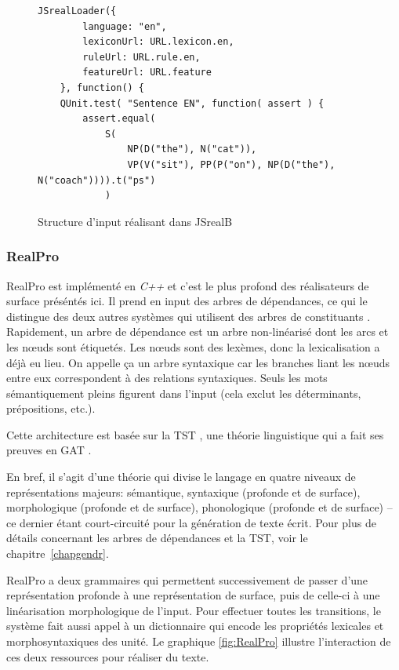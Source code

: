 \begin{figure}[htb]
\caption{Structure d'input réalisant  dans JSrealB}
\label{jsreal}
\begin{lstlisting}[language=mate]
JSrealLoader({
        language: "en",
        lexiconUrl: URL.lexicon.en,
        ruleUrl: URL.rule.en,
        featureUrl: URL.feature
    }, function() {
    QUnit.test( "Sentence EN", function( assert ) {
        assert.equal(
            S(
                NP(D("the"), N("cat")),
                VP(V("sit"), PP(P("on"), NP(D("the"), N("coach")))).t("ps")
            )
\end{lstlisting}
\end{figure}
		
\subsubsection{RealPro}
RealPro \citep{LavoieFastPortableRealizer1997} est implémenté en \emph{C++} et c'est le plus profond des réalisateurs de surface préséntés ici. Il prend en input des arbres de dépendances, ce qui le distingue des deux autres systèmes qui utilisent des arbres de constituants \citep{DBLP:conf/enlg/MolinsL15,GattSimpleNLGRealisationEngine2009}. Rapidement, un arbre de dépendance est un arbre non-linéarisé dont les arcs et les n\oe{}uds sont étiquetés. Les n\oe{}uds sont des lexèmes, donc la lexicalisation a déjà eu lieu. On appelle ça un arbre syntaxique car les branches liant les n\oe{}uds entre eux correspondent à des relations syntaxiques. Seuls les mots sémantiquement pleins figurent dans l'input (cela exclut les déterminants, prépositions, etc.).

Cette architecture est basée sur la \ac{TST} \citep{melcuk1988}, une théorie linguistique qui a fait ses preuves en \ac{GAT} \citep{iordanskaja88,LavoieFastPortableRealizer1997,WannerMARQUISGENERATIONUSERTAILORED2010,MilledemoFORGePompeu2017,Vicentegeneracionlenguajenatural2015}.

En bref, il s'agit d'une théorie qui divise le langage en quatre niveaux de représentations majeurs: sémantique, syntaxique (profonde et de surface), morphologique (profonde et de surface), phonologique (profonde et de surface) -- ce dernier étant court-circuité pour la génération de texte écrit. Pour plus de détails concernant les arbres de dépendances et la \ac{TST}, voir le chapitre~\ref{chapgendr}.

RealPro \citep{LavoieFastPortableRealizer1997} a deux grammaires qui permettent successivement de passer d'une représentation profonde à une représentation de surface, puis de celle-ci à une linéarisation morphologique de l'input. Pour effectuer toutes les transitions, le système fait aussi appel à un dictionnaire qui encode les propriétés lexicales et morphosyntaxiques des unité. Le graphique \ref{fig:RealPro} illustre l'interaction de ces deux ressources pour réaliser du texte.

